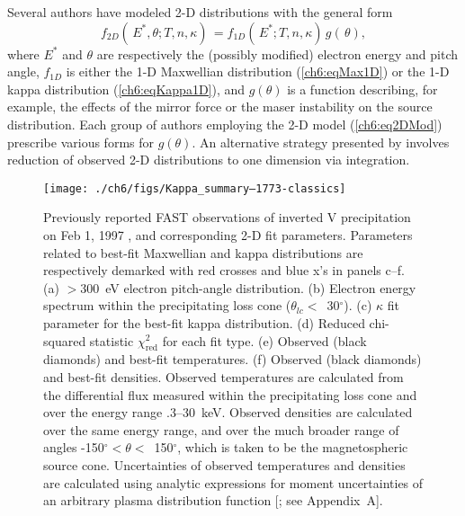   Several authors \citep{Maggs1981,Bingham1999,Bingham2000,Mutel2007} have
  modeled 2-D distributions with the general form
    \begin{equation} \label{ch6:eq2DMod} f_{2D}(\, E^*, \theta ; T, n,
      \kappa) \, = f_{1D}(\, E^*; T, n, \kappa) \, g(\, \theta),
    \end{equation}
    where $E^*$ and $\theta$ are respectively the (possibly modified)
    electron energy and pitch angle, $f_{1D}$ is either the 1-D
    Maxwellian distribution (\ref{ch6:eqMax1D}) or the 1-D kappa
    distribution (\ref{ch6:eqKappa1D}), and $g(\theta )$ is a function
    describing, for example, the effects of the mirror force or the
    maser instability on the source distribution. Each group of
    authors employing the 2-D model (\ref{ch6:eq2DMod}) prescribe
    various forms for $g(\theta)$.  An alternative strategy presented
    by \citet{Pritchett1999} involves reduction of observed 2-D
    distributions to one dimension via integration.


  \begin{figure}
    \centering
    \noindent\texttt{[image: ./ch6/figs/Kappa\_summary--1773-classics]}
    \caption[Inverted V precipitation and best-fit
    Maxwellian and kappa distribution parameters (Orbit 1773)]{Previously reported
      FAST observations of inverted V precipitation on Feb 1, 1997
      \citep{Elphic1998}, and corresponding 2-D fit
      parameters. Parameters related to best-fit Maxwellian and kappa
      distributions are respectively demarked with red crosses and
      blue x's in panels c--f. (a) $>$300~eV electron pitch-angle
      distribution. (b) Electron energy spectrum within the
      precipitating loss cone ($\theta_{lc} <$~30$^\circ$). (c) $\kappa$
      fit parameter for the best-fit kappa distribution. (d) Reduced
      chi-squared statistic $\chi^2_{\mathrm{red}}$ for each fit
      type. (e) Observed (black diamonds) and best-fit
      temperatures. (f) Observed (black diamonds) and best-fit
      densities. Observed temperatures are calculated from the
      differential flux measured within the precipitating loss cone and
      over the energy range .3--30~keV. Observed densities are
      calculated over the same energy range, and over the much broader
      range of angles -150$^\circ < \theta <$~150$^\circ$, which is
      taken to be the magnetospheric source cone. Uncertainties of
      observed temperatures and densities are calculated using
      analytic expressions for moment uncertainties of an arbitrary
      plasma distribution function [\citealt{Gershman2015}; see
      Appendix~A].}
    \label{ch6:Fig1}
  \end{figure}

